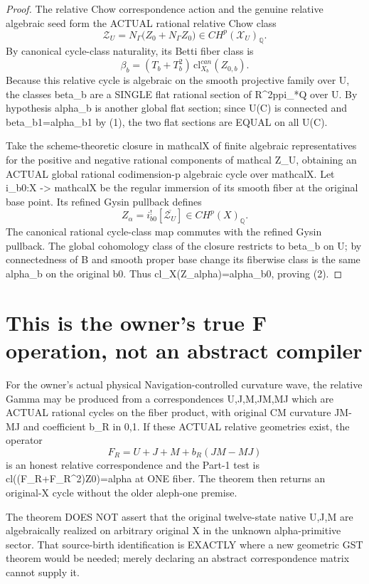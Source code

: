 \documentclass[11pt]{article}
\begin{document}
\begin{proof}
The relative Chow correspondence action and
the genuine relative algebraic seed form the
ACTUAL rational relative Chow class
\[
\mathcal Z_U=
N_\Gamma\bigl(Z_0+N_\Gamma Z_0\bigr)
\in CH^p(\mathcal X_U)_{\mathbb Q}.
\]
By canonical cycle-class naturality,
its Betti fiber class is
\[
\beta_b=(T_b+T_b^2)\,
\mathrm{cl}^{can}_{X_b}(Z_{0,b}).
\]
Because this relative cycle is algebraic
on the smooth projective family over U,
the classes beta_b are a SINGLE flat rational
section of R^{2p}pi_*Q over U.
By hypothesis alpha_b is another global
flat section; since U(C) is connected
and beta_b1=alpha_b1 by (1),
the two flat sections are EQUAL on all U(C).

Take the scheme-theoretic closure in mathcalX
of finite algebraic representatives for the
positive and negative rational components
of mathcal Z_U, obtaining an ACTUAL global
rational codimension-p algebraic cycle
over mathcalX. Let i_b0:X -> mathcalX
be the regular immersion of its smooth
fiber at the original base point.
Its refined Gysin pullback defines
\[
Z_\alpha=i_{b0}^{!}
  [\overline{\mathcal Z_U}]
\in CH^p(X)_{\mathbb Q}.
\]
The canonical rational cycle-class map
commutes with the refined Gysin pullback.
The global cohomology class of the closure
restricts to beta_b on U; by connectedness
of B and smooth proper base change its
fiberwise class is the same alpha_b
on the original b0.
Thus cl_X(Z_alpha)=alpha_b0, proving (2).
\end{proof}

\section{This is the owner's true F operation, not an abstract compiler}
For the owner's actual physical Navigation-controlled
curvature wave, the relative Gamma may be produced
from a correspondences U,J,M,JM,MJ which are
ACTUAL rational cycles on the fiber product,
with original CM curvature JM-MJ and
coefficient b_R in {0,1}.
If these ACTUAL relative geometries exist,
the operator
\[
F_R=U+J+M+b_R(JM-MJ)
\]
is an honest relative correspondence
and the Part-1 test is
cl((F_R+F_R^2)Z0)=alpha at ONE fiber.
The theorem then returns an original-X
cycle without the older aleph-one premise.

The theorem DOES NOT assert that the original
twelve-state native U,J,M are algebraically
realized on arbitrary original X in the
unknown alpha-primitive sector.
That source-birth identification is EXACTLY
where a new geometric GST theorem would be
needed; merely declaring an abstract
correspondence matrix cannot supply it.
\end{document}
